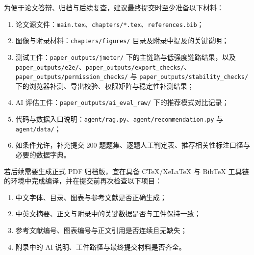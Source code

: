 为便于论文答辩、归档与后续复查，建议最终提交时至少准备以下材料：
\begin{enumerate}
  \item 论文源文件：\texttt{main.tex}、\texttt{chapters/*.tex}、\texttt{references.bib}；
  \item 图像与附录材料：\texttt{chapters/figures/} 目录及附录中提及的关键说明；
  \item 测试工件：\texttt{paper\_outputs/jmeter/} 下的主链路与低强度链路结果，以及 \texttt{paper\_outputs/e2e/}、\texttt{paper\_outputs/export\_checks/}、\texttt{paper\_outputs/permission\_checks/} 与 \texttt{paper\_outputs/stability\_checks/} 下的浏览器补测、导出校验、权限矩阵与稳定性补测结果；
  \item AI 评估工件：\texttt{paper\_outputs/ai\_eval\_raw/} 下的推荐模式对比记录；
  \item 代码与数据入口说明：\texttt{agent/rag.py}、\texttt{agent/recommendation.py} 与 \texttt{agent/data/}；
  \item 如条件允许，补充提交 200 题题集、逐题人工判定表、推荐相关性标注口径与必要的数据字典。
\end{enumerate}

若后续需要生成正式 PDF 归档版，宜在具备 CTeX/XeLaTeX 与 BibTeX 工具链的环境中完成编译，并在提交前再次检查以下项目：
\begin{enumerate}
  \item 中文字体、目录、图表与参考文献是否正确生成；
  \item 中英文摘要、正文与附录中的关键数据是否与工件保持一致；
  \item 参考文献编号、图表编号与正文引用是否连续且无缺失；
  \item 附录中的 AI 说明、工件路径与最终提交材料是否齐全。
\end{enumerate}



